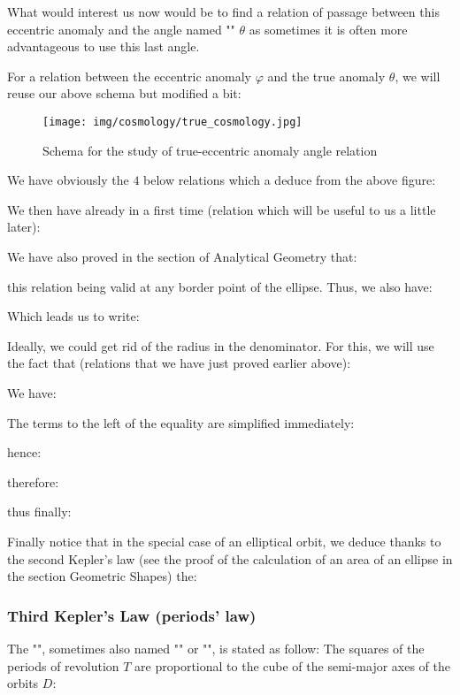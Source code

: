 	What would interest us now would be to find a relation of passage between this eccentric anomaly and the angle named "" $\theta$ as sometimes it is often more advantageous to use this last angle.

	For a relation between the eccentric anomaly $\varphi$ and the true anomaly $\theta$, we will reuse our above schema but modified a bit:
	\begin{figure}[H]
		\centering
		\texttt{[image: img/cosmology/true\_cosmology.jpg]}	
		\caption{Schema for the study of true-eccentric anomaly angle relation}
	\end{figure}
	We have obviously the $4$ below relations which a deduce from the above figure:
	
	We then have already in a first time (relation which will be useful to us a little later):
	
 	We have also proved in the section of Analytical Geometry that:
	
	this relation being valid at any border point of the ellipse. Thus, we also have:
	
 	Which leads us to write:
	
	Ideally, we could get rid of the radius in the denominator. For this, we will use the fact that (relations that we have just proved earlier above):
	
	We have:
	
 	The terms to the left of the equality are simplified immediately:
	
	hence:
	
 	therefore:
	
	thus finally:
	
	Finally notice that in the special case of an elliptical orbit, we deduce thanks to the second Kepler's law (see the proof of the calculation of an area of an ellipse in the section Geometric Shapes) the:
	
	\pagebreak
	\subsubsection{Third Kepler's Law (periods' law)}\label{third kepler law}
	The "", sometimes also named  "" or "", is stated as follow: The squares of the periods of revolution $T$ are proportional to the cube of the semi-major axes of the orbits $D$:
	

